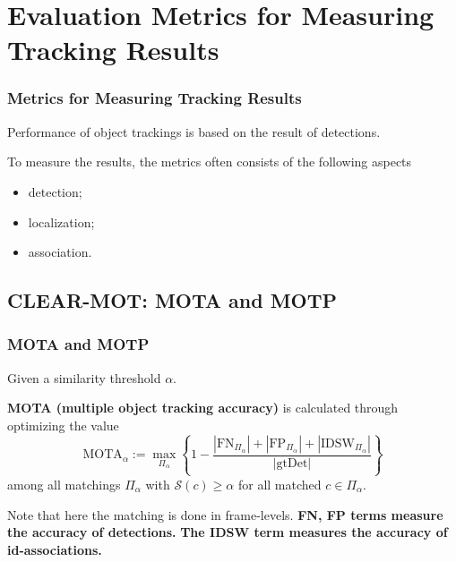 \documentclass[slidetop, mathserif]{beamer}
\begin{document}


\section{Evaluation Metrics for Measuring Tracking Results}

\begin{frame}
	\frametitle{Metrics for Measuring Tracking Results}
	
	Performance of object trackings is based on the result of detections.
	
	\quad 
	
	To measure the results, the metrics often consists of the following aspects
	\begin{itemize}
		\item detection;%
		\item localization;%
		\item association.%
	\end{itemize}
	    
\end{frame}

\subsection{CLEAR-MOT: MOTA and MOTP}

\begin{frame}
	\frametitle{MOTA and MOTP}
	
	
	Given a similarity threshold $\alpha$.
	
	\quad
	
	{\bf MOTA (multiple object tracking accuracy)} is calculated through optimizing the value
	\[
		\text{MOTA}_\alpha :=
		\max_{\Pi_\alpha}
		\left\{1 - \dfrac{|\text{FN}_{\Pi_\alpha}| + |\text{FP}_{\Pi_\alpha}| + |\text{IDSW}_{\Pi_\alpha}|}{|\text{gtDet}|}\right\}
	\]
	among all matchings $\Pi_\alpha$ with $\mathcal S(c)\geq \alpha$ for all matched $c\in\Pi_\alpha$.
	
	\quad
	
	Note that here the matching is done in frame-levels.
	{\bf\color{blue} FN, FP terms measure the accuracy of detections.}
	{\bf\color{olive} The IDSW term measures the accuracy of id-associations.}
	
\end{frame}
\end{document}
